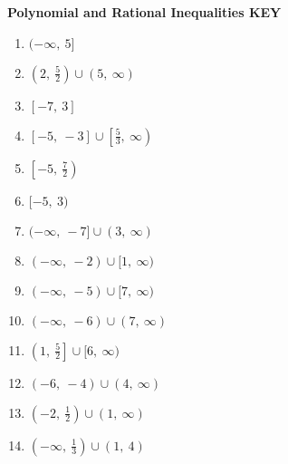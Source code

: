 \documentclass[11pt,a4paper]{exam}
\begin{document}


















\newpage


\textbf{Polynomial and Rational Inequalities KEY}
\begin{enumerate}
    \item $(-\infty, \ 5]$
    \item $\left(2, \ \frac{5}{2}\right) \cup (5, \ \infty)$
    \item $[-7, \ 3]$
    \item $[-5, \ -3] \cup \left[\frac{5}{3}, \ \infty\right)$
    \item $\left[-5, \ \frac{7}{2}\right)$
    \item $[-5, \ 3)$
    \item $(-\infty, \ -7] \cup (3, \ \infty)$
    \item $(-\infty, \ -2) \cup [1, \ \infty)$
    \item $(-\infty, \ -5) \cup [7, \ \infty)$
    \item $(-\infty, \ -6) \cup (7, \ \infty)$
    \item $\left(1, \ \frac{5}{2}\right] \cup [6, \ \infty)$
    \item $(-6, \ -4) \cup (4, \ \infty)$
    \item $\left(-2, \ \frac{1}{2}\right) \cup (1, \ \infty)$
    \item $\left(-\infty, \ \frac{1}{3}\right) \cup (1, \ 4)$
\end{enumerate}
\end{document}
